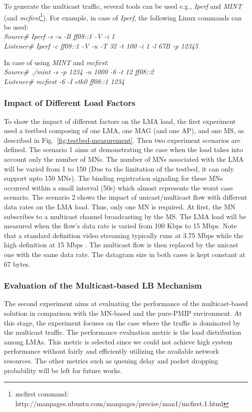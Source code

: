 To generate the multicast traffic, several tools can be used e.g., \textit{Iperf} \cite{iperf} and \textit{MINT} \cite{mint} (and \textit{mcfirst}\footnote{mcfirst command: http://manpages.ubuntu.com/manpages/precise/man1/mcfirst.1.html}). 
For example, in case of \textit{Iperf},  the following Linux commands can be used: \\
\textit{Source\# Iperf -s -u -B ff08::1 -V -i 1}\\
\textit{Listener\# Iperf -c ff08::1 -V -u -T 32 -t 100 -i 1 -l 67B -p 12345}

In case of using \textit{MINT} and \textit{mcfirst}: \\
\textit{Source\# ./mint -s -p 1234 -n 1000 -6 -t 12 ff08::2}\\
\textit{Listener\# mcfirst -6 -I eth0 ff08::1 1234}
\subsubsection{Impact of Different Load Factors} 
To show the impact of different factors on the LMA load, the first experiment used a testbed composing of one LMA, one MAG (and one AP), and one MS, as described in Fig.~\ref{fig:testbed-measurement}. Then two experiment scenarios are defined. The scenario 1 aims at demonstrating the case when the load takes into account only the number of MNs. The number of MNs associated with the LMA will be varied from 1 to 150 (Due to the limitation of the testbed, it can only support upto 150 MNs). The binding registration signaling for these MNs occurred within a small interval (50s) which almost represents the worst case scenario.  The scenario 2 shows the impact of unicast/multicast flow with different data rates on the LMA load. Thus, only one MN is required. At first, the MN subscribes to a multicast channel broadcasting by the MS. The LMA load will be measured when the flow's data rate is varied from 100 Kbps to 15 Mbps. Note that a standard definition video streaming typically runs at 3.75 Mbps while the high definition at 15 Mbps \cite{multicast-bandwidth}. The multicast flow is then replaced by the unicast one with the same data rate. The datagram size in both cases is kept constant at 67 bytes.
\subsubsection{Evaluation of the Multicast-based LB Mechanism}
The second experiment aims at evaluating the performance of the multicast-based solution in comparison with the MN-based and the pure-PMIP environment. At this stage, the experiment focuses on the case where the traffic is dominated by the multicast traffic. The performance evaluation metric is the load distribution among LMAs. This metric is selected since we could not achieve high system performance without fairly and efficiently utilizing the available network resources. The other metrics such as queuing delay and packet dropping probability will be left for future works. 

